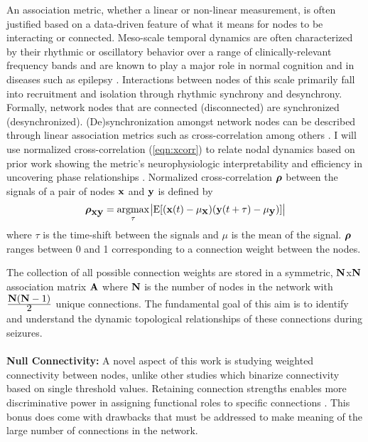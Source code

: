 An association metric, whether a linear or non-linear measurement, is often justified based on a data-driven feature of what it means for nodes to be interacting or connected. Meso-scale temporal dynamics are often characterized by their rhythmic or oscillatory behavior over a range of clinically-relevant frequency bands and are known to play a major role in normal cognition \cite{buzsaki2006rhythms} and in diseases such as epilepsy \cite{uhlhaas2006neural, jiruska2012synchronization}. Interactions between nodes of this scale primarily fall into recruitment and isolation through rhythmic synchrony and desynchrony. Formally, network nodes that are connected (disconnected) are synchronized (desynchronized). (De)synchronization amongst network nodes can be described through linear association metrics such as cross-correlation among others \cite{pereda2005nonlinear}. I will use normalized cross-correlation (\ref{eqn:xcorr}) to relate nodal dynamics based on prior work showing the metric's neurophysiologic interpretability and efficiency in uncovering phase relationships \cite{schiff2005neuronal, kramer2010coalescence}. Normalized cross-correlation $\boldsymbol{\displaystyle \rho}$ between the signals of a pair of nodes $\mathbf{\displaystyle x}$ and $\mathbf{\displaystyle y}$ is defined by
\begin{eqnarray}
\label{eqn:xcorr}
    \boldsymbol{\displaystyle \rho}_{\mathbf{\displaystyle xy}} = \underset{\tau}{\operatorname{argmax}}\:{\abs{\mathrm{E}[(\mathbf{\displaystyle x}(t) - \mu_{\mathbf{\displaystyle x}})(\mathbf{\displaystyle y}(t+\tau) - \mu_{\mathbf{\displaystyle y}})]}}
\end{eqnarray}
where $\tau$ is the time-shift between the signals and $\mu$ is the mean of the signal. $\boldsymbol{\displaystyle \rho}$ ranges between 0 and 1 corresponding to a connection weight between the nodes.

The collection of all possible connection weights are stored in a symmetric, $\mathbf{\displaystyle N}$x$\mathbf{\displaystyle N}$ association matrix $\mathbf{\displaystyle A}$ where $\mathbf{\displaystyle N}$ is the number of nodes in the network with $\frac{\displaystyle \mathbf{\displaystyle N}(\mathbf{\displaystyle N}-1)}{\displaystyle 2}$ unique connections. The fundamental goal of this aim is to identify and understand the dynamic topological relationships of these connections during seizures.
~\\
~\\
\textbf{Null Connectivity:}
A novel aspect of this work is studying weighted connectivity between nodes, unlike other studies which binarize connectivity based on single threshold values. Retaining connection strengths enables more discriminative power in assigning functional roles to specific connections \cite{bullmore2011brain}. This bonus does come with drawbacks that must be addressed to make meaning of the large number of connections in the network.

